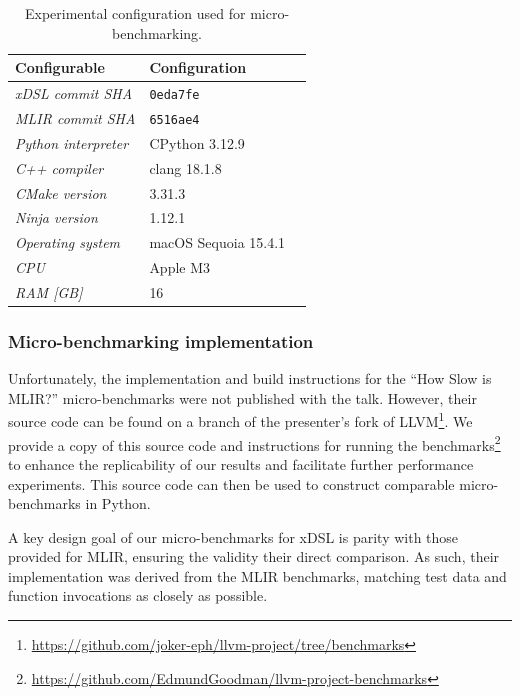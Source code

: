 \begin{table}[H]
  \caption{Experimental configuration used for micro-benchmarking.}
  \label{tab:ubenchmark-experimental-config}
  \centering
  \begin{tabular}{lll}
    \toprule
    \textbf{Configurable} & \textbf{Configuration} \\
    \midrule
    \textit{xDSL commit SHA} & \texttt{0eda7fe} \\
    \textit{MLIR commit SHA} & \texttt{6516ae4} \\
    \midrule
    \textit{Python interpreter} & CPython 3.12.9 \\
    \textit{C++ compiler} & clang 18.1.8 \\
    \textit{CMake version} & 3.31.3 \\
    \textit{Ninja version} & 1.12.1 \\
    \textit{Operating system} & macOS Sequoia 15.4.1 \\
    \midrule
    \textit{CPU} & Apple M3 \\
    \textit{RAM [GB]} & 16 \\
    \bottomrule
  \end{tabular}
\end{table}

\subsubsection{Micro-benchmarking implementation}
\label{sssec:ubenchmark-methodology-impl}

Unfortunately, the implementation and build instructions for the ``How Slow is MLIR?'' micro-benchmarks were not published with the talk.
However, their source code can be found on a branch of the presenter's fork of LLVM\footnote{\url{https://github.com/joker-eph/llvm-project/tree/benchmarks}}. We provide a copy of this source code and instructions for running the benchmarks\footnote{\url{https://github.com/EdmundGoodman/llvm-project-benchmarks}} to enhance the replicability of our results and facilitate further performance experiments.
This source code can then be used to construct comparable micro-benchmarks in Python.

A key design goal of our micro-benchmarks for xDSL is parity with those provided for MLIR, ensuring the validity their direct comparison. As such, their implementation was derived from the MLIR benchmarks, matching test data and function invocations as closely as possible.







